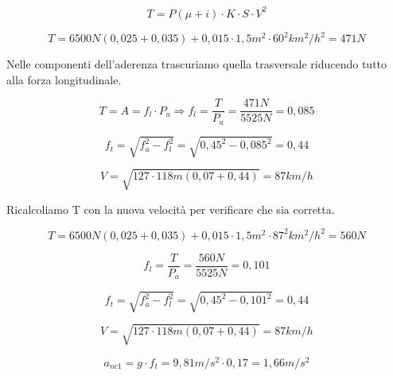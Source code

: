 \documentclass[
a4paper,
12pt, 
twoside]{scrbook}
\begin{document}
{{{{{{{   	\begin{equation}
   		T=P(\mu+i)\cdot K\cdot S\cdot V^2
   	\end{equation}
   	
   	\begin{equation}
   		T=6500N(0,025+0,035)+0,015\cdot 1,5m^2\cdot 60^2 km^2/h^2=471N
   	\end{equation}
   	
   	\begin{boxF}
   		Nelle componenti dell'aderenza trascuriamo quella trasversale riducendo tutto alla forza longitudinale.
   	\end{boxF} 	
   	
   	\begin{equation}
   		T=A=f_l\cdot P_a\Rightarrow f_l=\frac{T}{P_a}=\frac{471N}{5525N}=0,085
   	\end{equation}
   	
   	\begin{equation}
   		f_t=\sqrt{f^{2}_a-f^{2}_l}=\sqrt{0,45^2-0,085^2}=0,44
   	\end{equation}
   	
   	\begin{equation}
   		V=\sqrt{127\cdot 118m(0,07+0,44)}=87km/h
   	\end{equation}
   	
   	\begin{boxF}
   		Ricalcoliamo T con la nuova velocità per verificare che sia corretta.
   	\end{boxF} 	
   	
   	\begin{equation}
   		T=6500N(0,025+0,035)+0,015\cdot 1,5m^2\cdot 87^2 km^2/h^2=560N
   	\end{equation}
   	
   	\begin{equation}
   		f_l=\frac{T}{P_a}=\frac{560N}{5525N}=0,101
   	\end{equation}
   	
   	\begin{equation}
   		f_t=\sqrt{f^{2}_a-f^{2}_l}=\sqrt{0,45^2-0,101^2}=0,44
   	\end{equation}
   	
   	\begin{equation}
   		V=\sqrt{127\cdot 118m(0,07+0,44)}=87km/h
   	\end{equation}
   	
   	\begin{equation}
   		a_{nc1}=g\cdot f_t=9,81m/s^2\cdot 0,17=1,66m/s^2
   	\end{equation}
   	
}}}}}}}
\end{document}
